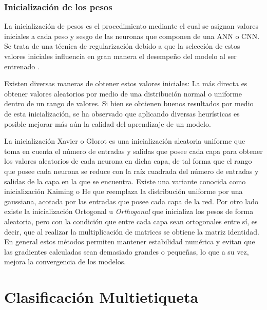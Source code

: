 \subsubsection{Inicialización de los pesos}
La inicialización de pesos es el procedimiento mediante el cual se asignan valores iniciales a cada peso y sesgo de las neuronas que componen de una ANN o CNN. Se trata de una técnica de regularización debido a que la selección de estos valores iniciales influencia en gran manera el desempeño del modelo al ser entrenado \cite{Goodfellow-et-al-2016}.

Existen diversas maneras de obtener estos valores iniciales: La más directa es obtener valores aleatorios por medio de una distribución normal o uniforme dentro de un rango de valores. Si bien se obtienen buenos resultados por medio de esta inicialización, se ha observado que aplicando diversas heurísticas es posible mejorar más aún la calidad del aprendizaje de un modelo.

La inicialización Xavier o Glorot \cite{glorot2010understanding} es una inicialización aleatoria uniforme que toma en cuenta el número de entradas y salidas que posee cada capa para obtener los valores aleatorios de cada neurona en dicha capa, de tal forma que el rango que posee cada neurona se reduce con la raíz cuadrada del número de entradas y salidas de la capa en la que se encuentra. Existe una variante conocida como inicialización Kaiming o He \cite{he2015delving} que reemplaza la distribución uniforme por una gaussiana, acotada por las entradas que posee cada capa de la red. Por otro lado existe la inicialización Ortogonal u \textit{Orthogonal} \cite{saxe_exact_2013} que inicializa los pesos de forma aleatoria, pero con la condición que entre cada capa sean ortogonales entre sí, es decir, que al realizar la multiplicación de matrices se obtiene la matriz identidad. En general estos métodos permiten mantener estabilidad numérica y evitan que las gradientes calculadas sean demasiado grandes o pequeñas, lo que a su vez, mejora la convergencia de los modelos.

\FloatBarrier

\section{Clasificación Multietiqueta}
\label{section2:multilabel}

